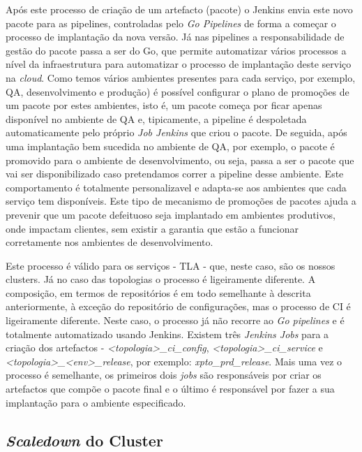 
Após este processo de criação de um artefacto (pacote) o Jenkins envia este novo pacote para as
\glspl{pipeline}, controladas pelo \textit{Go Pipelines} de forma a começar o processo de 
implantação da nova versão. Já nas \glspl{pipeline} a responsabilidade de gestão do pacote passa a 
ser do Go, que permite automatizar vários processos a nível da infraestrutura para automatizar o 
processo de implantação deste serviço na \textit{cloud}. Como temos vários ambientes presentes para 
cada serviço, por exemplo, \ac{QA}, desenvolvimento e produção) é possível configurar o plano de 
promoções de um pacote por estes ambientes, isto é, um pacote começa por ficar apenas disponível no 
ambiente de QA e, tipicamente, a \gls{pipeline} é despoletada automaticamente pelo próprio 
\textit{Job Jenkins} que criou o pacote. De seguida, após uma implantação bem sucedida no ambiente 
de QA, por exemplo, o pacote é promovido para o ambiente de desenvolvimento, ou seja, passa a ser 
o pacote que vai ser disponibilizado caso pretendamos correr a \gls{pipeline} desse ambiente. 
Este comportamento é totalmente personalizavel e adapta-se aos ambientes que cada serviço tem 
disponíveis. Este tipo de mecanismo de promoções de pacotes ajuda a prevenir que um pacote 
defeituoso seja implantado em ambientes produtivos, onde impactam clientes, sem existir a garantia 
que estão a funcionar corretamente nos ambientes de desenvolvimento.

Este processo é válido para os serviços - \ac{TLA} - que, neste caso, são os nossos \glspl{cluster}.
Já no caso das topologias o processo é ligeiramente diferente. A composição, em termos de 
repositórios é em todo semelhante à descrita anteriormente, à exceção do repositório de configurações,
mas o processo de \ac{CI} é ligeiramente diferente. Neste caso, o processo já não recorre ao 
\textit{Go pipelines} e é totalmente automatizado usando Jenkins. Existem três \textit{Jenkins Jobs} 
para a criação dos artefactos - \textit{<topologia>\_ci\_config}, \textit{<topologia>\_ci\_service}
e \textit{<topologia>\_<env>\_release}, por exemplo: \textit{xpto\_prd\_release}. Mais uma vez o 
processo é semelhante, os primeiros dois \textit{jobs} são responsáveis por criar os artefactos 
que compõe o pacote final e o último é responsável por fazer a sua implantação para o ambiente 
especificado.

\subsection{\textit{Scaledown} do Cluster}

